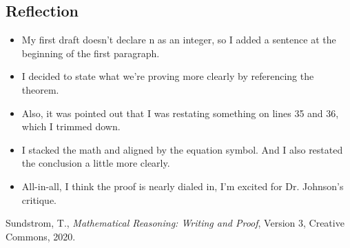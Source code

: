 \documentclass[12pt]{article}
\theoremstyle{definition}
\begin{document}
\newpage

\subsection{Reflection}

    \begin{itemize}
        \item My first draft doesn't declare n as an integer, so I added a sentence at the beginning of the first paragraph. 
        \item I decided to state what we're proving more clearly by referencing the theorem.
        \item Also, it was pointed out that I was restating something on lines 35 and 36, which I trimmed down.
        \item I stacked the math and aligned by the equation symbol. And I also restated the conclusion a little more clearly.\
        \item All-in-all, I think the proof is nearly dialed in, I'm excited for Dr. Johnson's critique.
    \end{itemize}

\vspace{1em}
\begin{thebibliography}{9}
 Sundstrom, T., \emph{Mathematical Reasoning: Writing and Proof}, Version 3,  Creative Commons, 2020.

\end{thebibliography}
\end{document}
